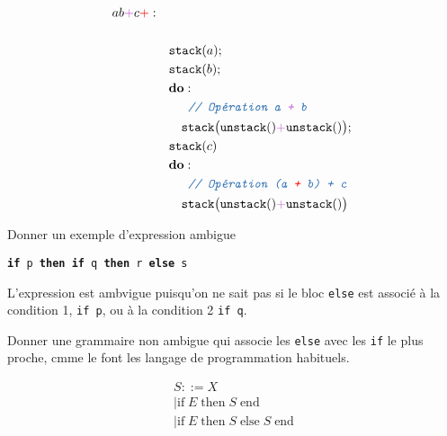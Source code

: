 \documentclass{report}
\begin{document}
\begin{multicols*}{3}
\begin{align*}
    ab \textcolor{myp}{+}   c \textcolor{red}{+} : \quad & \\  
    \\
                     & \texttt{stack}(a); 
    \\
                     & \texttt{stack}(b); 
    \\
                     & \textbf{do}   :
                     \\ 
                     & \quad \textcolor{myb}{\texttt{\textit{ // Opération a \textcolor{myp}{+}   b}}}  
    \\
                     & \quad \texttt{stack}\bigl(\texttt{unstack}() \textcolor{myp}{+}   \texttt{unstack}()\bigr);
    \\ 
                     & \texttt{stack}(c) 
    \\
                     & \textbf{do} : 
                     \\ 
                      & \quad \textcolor{myb}{\texttt{\textit{ // Opération (a \textcolor{red}{+}   b) + c }}}                    
    \\
                     & \quad \texttt{stack}\bigl(\texttt{unstack}() \textcolor{myp}{+}   \texttt{unstack}() \bigr)
\end{align*}


\begin{Exercice}{}{}
Donner un exemple d'expression ambigue    
\end{Exercice}

\texttt{\textbf{if}   p \textbf{then} \textbf{if} q \textbf{then} r \textbf{else} s}  

L'expression est ambvigue puisqu'on ne sait pas si le bloc \texttt{else} est associé à la condition 
1, \texttt{if p}, ou à la condition 2 \texttt{if q}.      


\begin{Exercice}{}{}
    Donner une grammaire non ambigue qui associe les \texttt{else} avec les 
    \texttt{if} le plus proche, cmme le font les langage de programmation habituels.  
\end{Exercice}


\begin{align*}
 S ::= X \\
    \mid \text{if} \; E \; \text{then} \; S \; \text{end} \\
    \mid \text{if} \; E \; \text{then} \; S \; \text{else} \; S \; \text{end}           
\end{align*}


\end{multicols*}
\end{document}
